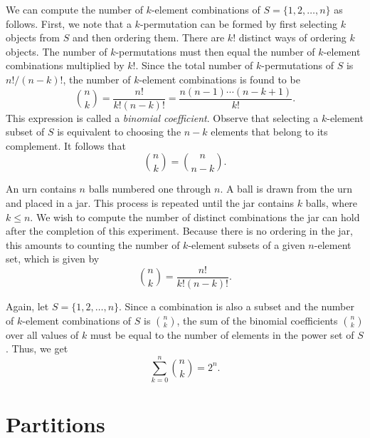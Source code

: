 We can compute the number of $k$-element combinations of $S = \{ 1, 2, \ldots, n \}$ as follows.
First, we note that a $k$-permutation can be formed by first selecting $k$ objects from $S$ and then ordering them.
There are $k!$ distinct ways of ordering $k$ objects.
The number of $k$-permutations must then equal the number of $k$-element combinations multiplied by $k!$.
Since the total number of $k$-permutations of $S$ is $n! / (n-k)!$, the number of $k$-element combinations is found to be
\begin{equation*}
\binom{n}{k} = \frac{n!}{k! (n-k)!} = \frac{ n (n-1) \cdots (n-k+1) }{ k! } .
\end{equation*}
This expression is called a \emph{binomial coefficient}.
Observe that selecting a $k$-element subset of $S$ is equivalent to choosing the $n-k$ elements that belong to its complement.
It follows that
\begin{equation*}
\binom{n}{k} = \binom{n}{n-k} .
\end{equation*}

\begin{example}
An urn contains $n$ balls numbered one through $n$.
A ball is drawn from the urn and placed in a jar.
This process is repeated until the jar contains $k$ balls, where $k \leq n$.
We wish to compute the number of distinct combinations the jar can hold after the completion of this experiment.
Because there is no ordering in the jar, this amounts to counting the number of $k$-element subsets of a given $n$-element set, which is given by
\begin{equation*}
\binom{n}{k} = \frac{n!}{k! (n-k)!}.
\end{equation*}
\end{example}

Again, let $S = \{1, 2, \ldots, n\}$.
Since a combination is also a subset and the number of $k$-element combinations of $S$ is $\binom{n}{k}$, the sum of the binomial coefficients $\binom{n}{k}$ over all values of $k$ must be equal to the number of elements in the power set of $S$.
Thus, we get
\begin{equation*}
\sum_{k=0}^n \binom{n}{k} = 2^n .
\end{equation*}


\section{Partitions}

